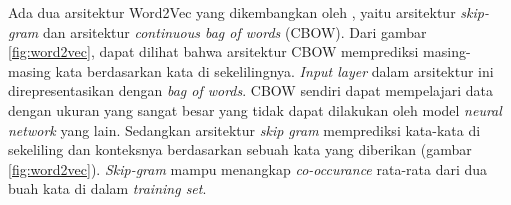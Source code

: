 Ada dua arsitektur Word2Vec yang dikembangkan oleh \cite{mikolov2014word2vec}, yaitu arsitektur \textit{skip-gram} dan arsitektur \textit{continuous bag of words} (CBOW). Dari gambar \ref{fig:word2vec}, dapat dilihat bahwa arsitektur CBOW memprediksi masing-masing kata berdasarkan kata di sekelilingnya. \textit{Input layer} dalam arsitektur ini direpresentasikan dengan \textit{bag of words}. CBOW sendiri dapat mempelajari data dengan ukuran yang sangat besar yang tidak dapat dilakukan oleh model \textit{neural network} yang lain. Sedangkan arsitektur \textit{skip gram} memprediksi kata-kata di sekeliling dan konteksnya berdasarkan sebuah kata yang diberikan (gambar \ref{fig:word2vec}). \textit{Skip-gram} mampu menangkap \textit{co-occurance} rata-rata dari dua buah kata di dalam \textit{training set}.
